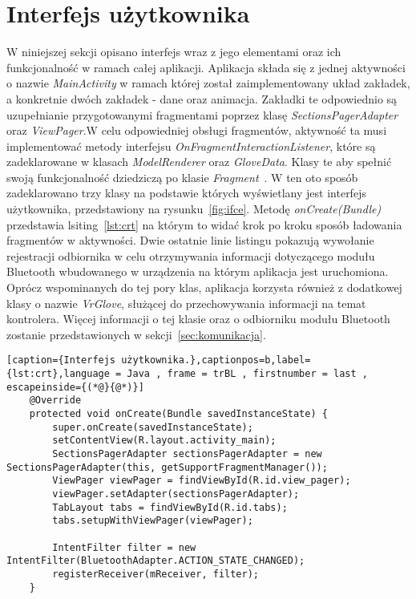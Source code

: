 \section{Interfejs użytkownika}
\label{sec:interface}
W niniejszej sekcji opisano interfejs wraz z jego elementami oraz ich funkcjonalność w ramach całej aplikacji. Aplikacja składa się z jednej aktywności o nazwie \textit{MainActivity} w ramach której został zaimplementowany układ zakładek, a konkretnie dwóch zakładek - dane oraz animacja. Zakładki te odpowiednio są uzupełnianie przygotowanymi fragmentami poprzez klasę \textit{SectionsPagerAdapter} oraz \textit{ViewPager}.W celu odpowiedniej obsługi fragmentów, aktywność ta musi implementować metody interfejsu \textit{OnFragmentInteractionListener}, które są zadeklarowane w klasach \textit{ModelRenderer} oraz \textit{GloveData}. Klasy te aby spełnić swoją funkcjonalność dziedziczą po klasie \textit{Fragment}~\cite{AndroidDoc}. W ten oto sposób zadeklarowano trzy klasy na podstawie których wyświetlany jest interfejs użytkownika, przedstawiony na rysunku~\ref{fig:ifce}. Metodę \textit{onCreate(Bundle)} przedstawia lsiting~\ref{lst:crt} na którym to widać krok po kroku sposób ładowania fragmentów w aktywności. Dwie ostatnie linie listingu pokazują wywołanie rejestracji odbiornika w celu otrzymywania informacji dotyczącego modułu Bluetooth wbudowanego w urządzenia na którym aplikacja jest uruchomiona. Oprócz wspominanych do tej pory klas, aplikacja korzysta również z dodatkowej klasy o nazwie \textit{VrGlove}, służącej do przechowywania informacji na temat kontrolera. Więcej informacji o tej klasie oraz o odbiorniku modułu Bluetooth zostanie przedstawionych w sekcji~\ref{sec:komunikacja}. 
\begin{lstlisting}[caption={Interfejs użytkownika.},captionpos=b,label={lst:crt},language = Java , frame = trBL , firstnumber = last , escapeinside={(*@}{@*)}]
    @Override
    protected void onCreate(Bundle savedInstanceState) {
        super.onCreate(savedInstanceState);
        setContentView(R.layout.activity_main);
        SectionsPagerAdapter sectionsPagerAdapter = new SectionsPagerAdapter(this, getSupportFragmentManager());
        ViewPager viewPager = findViewById(R.id.view_pager);
        viewPager.setAdapter(sectionsPagerAdapter);
        TabLayout tabs = findViewById(R.id.tabs);
        tabs.setupWithViewPager(viewPager);

        IntentFilter filter = new IntentFilter(BluetoothAdapter.ACTION_STATE_CHANGED);
        registerReceiver(mReceiver, filter);
    }
\end{lstlisting}


